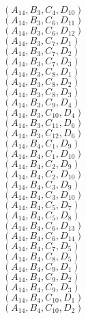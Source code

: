\documentclass[14pt]{article}
\begin{document}
    $({A}_{14}, {B}_{3}, {C}_{4}, {D}_{10}) $ \\ 
    $({A}_{14}, {B}_{3}, {C}_{6}, {D}_{11}) $ \\ 
    $({A}_{14}, {B}_{3}, {C}_{6}, {D}_{12}) $ \\ 
    $({A}_{14}, {B}_{3}, {C}_{7}, {D}_{1}) $ \\ 
    $({A}_{14}, {B}_{3}, {C}_{7}, {D}_{2}) $ \\ 
    $({A}_{14}, {B}_{3}, {C}_{7}, {D}_{3}) $ \\ 
    $({A}_{14}, {B}_{3}, {C}_{8}, {D}_{1}) $ \\ 
    $({A}_{14}, {B}_{3}, {C}_{8}, {D}_{2}) $ \\ 
    $({A}_{14}, {B}_{3}, {C}_{8}, {D}_{3}) $ \\ 
    $({A}_{14}, {B}_{3}, {C}_{9}, {D}_{4}) $ \\ 
    $({A}_{14}, {B}_{3}, {C}_{10}, {D}_{4}) $ \\ 
    $({A}_{14}, {B}_{3}, {C}_{11}, {D}_{6}) $ \\ 
    $({A}_{14}, {B}_{3}, {C}_{12}, {D}_{6}) $ \\ 
    $({A}_{14}, {B}_{4}, {C}_{1}, {D}_{9}) $ \\ 
    $({A}_{14}, {B}_{4}, {C}_{1}, {D}_{10}) $ \\ 
    $({A}_{14}, {B}_{4}, {C}_{2}, {D}_{9}) $ \\ 
    $({A}_{14}, {B}_{4}, {C}_{2}, {D}_{10}) $ \\ 
    $({A}_{14}, {B}_{4}, {C}_{3}, {D}_{9}) $ \\ 
    $({A}_{14}, {B}_{4}, {C}_{3}, {D}_{10}) $ \\ 
    $({A}_{14}, {B}_{4}, {C}_{5}, {D}_{7}) $ \\ 
    $({A}_{14}, {B}_{4}, {C}_{5}, {D}_{8}) $ \\ 
    $({A}_{14}, {B}_{4}, {C}_{6}, {D}_{13}) $ \\ 
    $({A}_{14}, {B}_{4}, {C}_{6}, {D}_{14}) $ \\ 
    $({A}_{14}, {B}_{4}, {C}_{7}, {D}_{5}) $ \\ 
    $({A}_{14}, {B}_{4}, {C}_{8}, {D}_{5}) $ \\ 
    $({A}_{14}, {B}_{4}, {C}_{9}, {D}_{1}) $ \\ 
    $({A}_{14}, {B}_{4}, {C}_{9}, {D}_{2}) $ \\ 
    $({A}_{14}, {B}_{4}, {C}_{9}, {D}_{3}) $ \\ 
    $({A}_{14}, {B}_{4}, {C}_{10}, {D}_{1}) $ \\ 
    $({A}_{14}, {B}_{4}, {C}_{10}, {D}_{2}) $ \\ 
\end{document}
